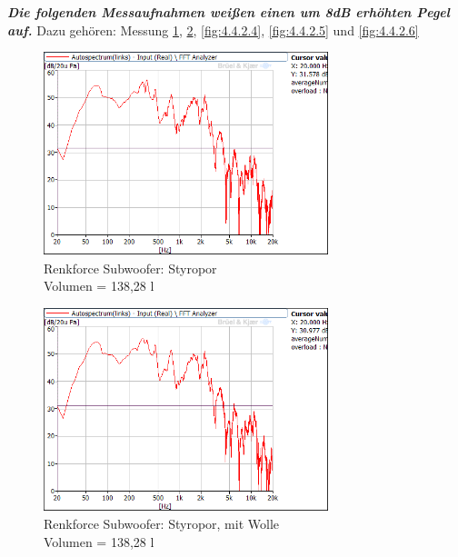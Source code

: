 \newpage
\textit{\textbf{ Die folgenden Messaufnahmen weißen einen um 8dB erhöhten Pegel auf.}} Dazu gehören: Messung \ref{fig:4.4.2.2}, \ref{fig:4.4.2.3}, \ref{fig:4.4.2.4}, \ref{fig:4.4.2.5} und \ref{fig:4.4.2.6}\\

\begin{figure} [H]
\centering
\includegraphics[width=0.74\textwidth]{img/Optimierung/Sub/RenkforceStyro_138l.png}
\caption{Renkforce Subwoofer: Styropor \\Volumen = 138,28 l}
\label{fig:4.4.2.2}
\end{figure}

\begin{figure} [H]
\centering
\includegraphics[width=0.74\textwidth]{img/Optimierung/Sub/RenkforceStyro_138l_Wolle.png}
\caption{Renkforce Subwoofer: Styropor, mit Wolle \\Volumen = 138,28 l}
\label{fig:4.4.2.3}
\end{figure}

